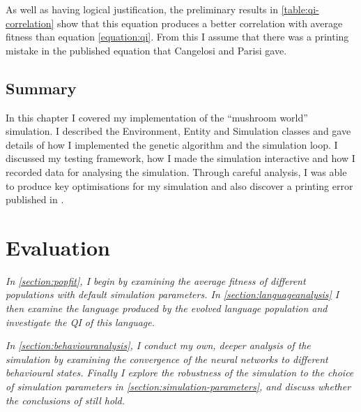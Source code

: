 \documentclass[12pt,a4paper]{report}
\begin{document}
As well as having logical justification, the preliminary results in \cref{table:qi-correlation} show that this equation produces a better correlation with average fitness than equation \ref{equation:qi}. From this I assume that there was a printing mistake in the published equation that Cangelosi and Parisi gave. 

\section{Summary}

In this chapter I covered my implementation of the ``mushroom world'' simulation. I described the Environment, Entity and Simulation classes and gave details of how I implemented the genetic algorithm and the simulation loop. I discussed my testing framework, how I made the simulation interactive and how I recorded data for analysing the simulation. Through careful analysis, I was able to produce key optimisations for my simulation and also discover a printing error published in \citet{Cangelosi1998}.


\chapter{Evaluation}

\emph{In \cref{section:popfit}, I begin by examining the average fitness of different populations with default simulation parameters. In \cref{section:languageanalysis} I then examine the language produced by the evolved language population and investigate the QI of this language. }

\emph{In \cref{section:behaviouranalysis}, I conduct my own, deeper analysis of the simulation by examining the convergence of the neural networks to different behavioural states. Finally I explore the robustness of the simulation to the choice of simulation parameters in \cref{section:simulation-parameters}, and discuss whether the conclusions of \citet{Cangelosi1998} still hold.}
\end{document}
